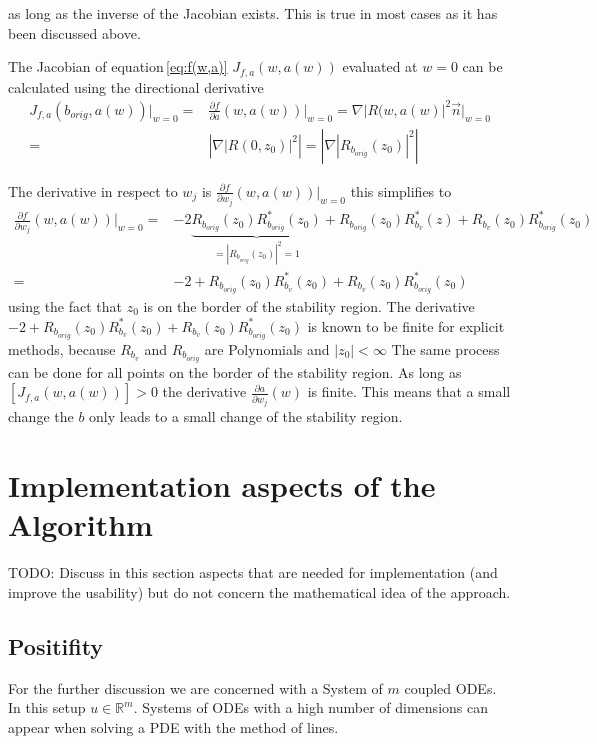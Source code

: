 \documentclass{article}
\begin{document}
as long as the inverse of the Jacobian exists. This is true in most cases as it has been discussed above.

The Jacobian of equation\,\ref{eq:f(w,a)} $J_{f,a}(w,a(w))$ evaluated at $w=0$ can be calculated using the directional derivative
\begin{align*}
 J_{f,a}(b_{orig},a(w)) \Big|_{w=0} =& 
 \frac{\partial f}{\partial a} (w,a(w)) \Big|_{w=0} = 
 \nabla |R(w,a(w)|^2 \vec{n} \Big|_{w=0} \\
=& \left| \nabla|R(0,z_0)|^2 \right| = \left| \nabla|R_{b_{orig}}(z_0)|^2 \right|
\end{align*} 

The derivative in respect to $w_j$ is 
$ \frac{\partial f}{\partial w_j}(w,a(w)) \Big|_{w=0}$
this simplifies to 
\begin{align*}\label{eq:derivative_to_b}
 \frac{\partial f}{\partial w_j}(w,a(w)) \Big|_{w=0} =&
- 2 \underbrace{R_{b_{orig}}(z_0)R^*_{b_{orig}}(z_0)}_{=|R_{b_{orig}}(z_0)|^2=1} + R_{b_{orig}}(z_0)R^*_{b_v}(z) + R_{b_v}(z_0)R^*_{b_{orig}}(z_0) \\
=& -2 + R_{b_{orig}}(z_0)R^*_{b_v}(z_0) + R_{b_v}(z_0)R^*_{b_{orig}}(z_0)
\end{align*}
using the fact that $z_0$ is on the border of the stability region.
The derivative $-2 + R_{b_{orig}}(z_0)R^*_{b_v}(z_0) + R_{b_v}(z_0)R^*_{b_{orig}}(z_0)$ is known to be finite for explicit methods, because $R_{b_v}$ and $R_{b_{orig}}$ are Polynomials and $|z_0| < \infty$
The same process can be done for all points on the border of the stability region. 
As long as $\left[ J_{f,a}(w,a(w))  \right] > 0$ the derivative $\frac{\partial a}{\partial w_j} (w)$ is finite. This means that a small change the $b$ only leads to a small change of the stability region.



\section{Implementation aspects of the Algorithm}

TODO: Discuss in this section aspects that are needed for implementation (and improve the usability) but do not concern the mathematical idea of the approach.

\subsection{Positifity}


For the further discussion we are concerned with a System of $m$ coupled ODEs. 
In this setup  $u \in \mathbb{R}^m$.
Systems of ODEs with a high number of dimensions can appear when solving a PDE with the method of lines.
\end{document}

